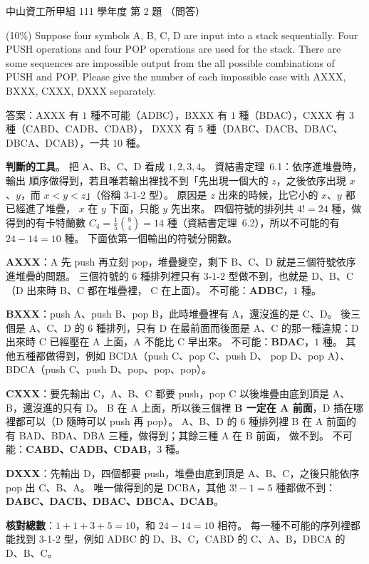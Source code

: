 \begin{pastexam}[label={px:nsysu-111-osds-02}]{中山資工所甲組 111 學年度 第 2 題}
（問答）

(10\%) Suppose four symbols A, B, C, D are input into a stack sequentially. Four PUSH operations
and four POP operations are used for the stack. There are some sequences are impossible output
from the all possible combinations of PUSH and POP. Please give the number of each impossible
case with AXXX, BXXX, CXXX, DXXX separately.
\end{pastexam}

\begin{pastsoln}
答案：AXXX 有 $1$ 種不可能（ADBC），BXXX 有 $1$ 種（BDAC），CXXX 有 $3$ 種（CABD、CADB、CDAB），
DXXX 有 $5$ 種（DABC、DACB、DBAC、DBCA、DCAB），一共 $10$ 種。

\textbf{判斷的工具}。 把 A、B、C、D 看成 $1, 2, 3, 4$。 資結書定理~6.1：依序進堆疊時，輸出
順序做得到，若且唯若輸出裡找不到「先出現一個大的 $z$，之後依序出現 $x$、$y$，而
$x < y < z$」（俗稱 3-1-2 型）。 原因是 $z$ 出來的時候，比它小的 $x$、$y$ 都已經進了堆疊，
$x$ 在 $y$ 下面，只能 $y$ 先出來。 四個符號的排列共 $4! = 24$ 種，做得到的有卡特蘭數
$C_4 = \frac{1}{5}\binom{8}{4} = 14$ 種（資結書定理~6.2），所以不可能的有 $24 - 14 = 10$ 種。
下面依第一個輸出的符號分開數。

\textbf{AXXX}：A 先 push 再立刻 pop，堆疊變空，剩下 B、C、D 就是三個符號依序進堆疊的問題。
三個符號的 $6$ 種排列裡只有 $3$-$1$-$2$ 型做不到，也就是 D、B、C（D 出來時 B、C 都在堆疊裡，
C 在上面）。 不可能：\textbf{ADBC}，$1$ 種。

\textbf{BXXX}：push A、push B、pop B，此時堆疊裡有 A，還沒進的是 C、D。 後三個是 A、C、D 的
$6$ 種排列，只有 D 在最前面而後面是 A、C 的那一種違規：D 出來時 C 已經壓在 A 上面，A 不能比 C
早出來。 不可能：\textbf{BDAC}，$1$ 種。 其他五種都做得到，例如 BCDA（push C、pop C、push D、
pop D、pop A）、BDCA（push C、push D、pop、pop、pop）。

\textbf{CXXX}：要先輸出 C，A、B、C 都要 push，pop C 以後堆疊由底到頂是 A、B，還沒進的只有 D。
B 在 A 上面，所以後三個裡 \textbf{B 一定在 A 前面}，D 插在哪裡都可以（D 隨時可以 push 再 pop）。
A、B、D 的 $6$ 種排列裡 B 在 A 前面的有 BAD、BDA、DBA 三種，做得到；其餘三種 A 在 B 前面，
做不到。 不可能：\textbf{CABD、CADB、CDAB}，$3$ 種。

\textbf{DXXX}：先輸出 D，四個都要 push，堆疊由底到頂是 A、B、C，之後只能依序 pop 出 C、B、A。
唯一做得到的是 DCBA，其他 $3! - 1 = 5$ 種都做不到：\textbf{DABC、DACB、DBAC、DBCA、DCAB}。

\textbf{核對總數}：$1 + 1 + 3 + 5 = 10$，和 $24 - 14 = 10$ 相符。 每一種不可能的序列裡都能找到
3-1-2 型，例如 ADBC 的 D、B、C，CABD 的 C、A、B，DBCA 的 D、B、C。
\end{pastsoln}
